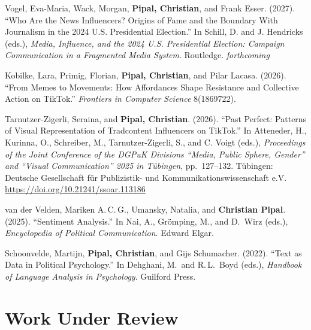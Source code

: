 \documentclass[11pt,a4paper]{article}
\begin{document}
\begin{enumerate}[leftmargin=2em, label={[\arabic*]}]

\item Vogel, Eva-Maria, Wack, Morgan, \textbf{Pipal, Christian}, and Frank Esser. (2027). ``Who Are the News Influencers? Origins of Fame and the Boundary With Journalism in the 2024 U.S. Presidential Election.'' In Schill, D. and J. Hendricks (eds.), \textit{Media, Influence, and the 2024 U.S. Presidential Election: Campaign Communication in a Fragmented Media System}. Routledge. \textit{forthcoming}

\item Kobilke, Lara, Primig, Florian, \textbf{Pipal, Christian}, and Pilar Lacasa. (2026). ``From Memes to Movements: How Affordances Shape Resistance and Collective Action on TikTok.'' \textit{Frontiers in Computer Science} 8(1869722).

\item Tarnutzer-Zigerli, Seraina, and \textbf{Pipal, Christian}. (2026). ``Past Perfect: Patterns of Visual Representation of Tradcontent Influencers on TikTok.'' In Atteneder, H., Kurinna, O., Schreiber, M., Tarnutzer-Zigerli, S., and C. Voigt (eds.), \textit{Proceedings of the Joint Conference of the DGPuK Divisions ``Media, Public Sphere, Gender'' and ``Visual Communication'' 2025 in Tübingen}, pp.~127--132. Tübingen: Deutsche Gesellschaft für Publizistik- und Kommunikationswissenschaft e.V. \url{https://doi.org/10.21241/ssoar.113186}

\item van der Velden, Mariken A.\,C.\,G., Umansky, Natalia, and \textbf{Christian Pipal}. (2025). ``Sentiment Analysis.'' In Nai, A., Gr\"omping, M., and D.\ Wirz (eds.), \textit{Encyclopedia of Political Communication}. Edward Elgar.

\item Schoonvelde, Martijn, \textbf{Pipal, Christian}, and Gijs Schumacher. (2022). ``Text as Data in Political Psychology.'' In Dehghani, M.\ and R.\,L.\ Boyd (eds.), \textit{Handbook of Language Analysis in Psychology}. Guilford Press.

\end{enumerate}


\section{Work Under Review}
\end{document}
